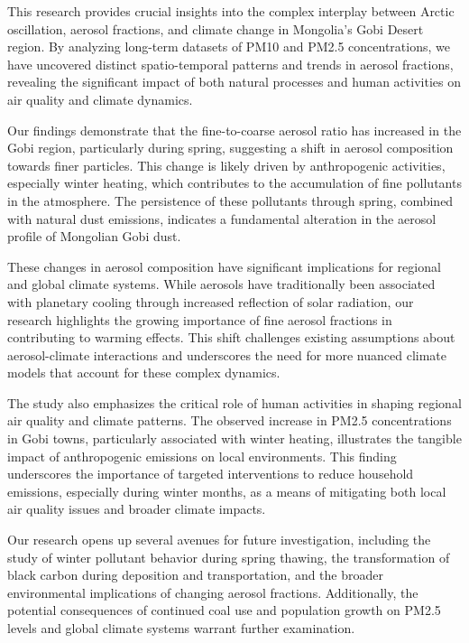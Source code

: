 \documentclass[
  11pt,
]{article}
\begin{document}
This research provides crucial insights into the complex interplay
between Arctic oscillation, aerosol fractions, and climate change in
Mongolia's Gobi Desert region. By analyzing long-term datasets of PM10
and PM2.5 concentrations, we have uncovered distinct spatio-temporal
patterns and trends in aerosol fractions, revealing the significant
impact of both natural processes and human activities on air quality and
climate dynamics.

Our findings demonstrate that the fine-to-coarse aerosol ratio has
increased in the Gobi region, particularly during spring, suggesting a
shift in aerosol composition towards finer particles. This change is
likely driven by anthropogenic activities, especially winter heating,
which contributes to the accumulation of fine pollutants in the
atmosphere. The persistence of these pollutants through spring, combined
with natural dust emissions, indicates a fundamental alteration in the
aerosol profile of Mongolian Gobi dust.

These changes in aerosol composition have significant implications for
regional and global climate systems. While aerosols have traditionally
been associated with planetary cooling through increased reflection of
solar radiation, our research highlights the growing importance of fine
aerosol fractions in contributing to warming effects. This shift
challenges existing assumptions about aerosol-climate interactions and
underscores the need for more nuanced climate models that account for
these complex dynamics.

The study also emphasizes the critical role of human activities in
shaping regional air quality and climate patterns. The observed increase
in PM2.5 concentrations in Gobi towns, particularly associated with
winter heating, illustrates the tangible impact of anthropogenic
emissions on local environments. This finding underscores the importance
of targeted interventions to reduce household emissions, especially
during winter months, as a means of mitigating both local air quality
issues and broader climate impacts.

Our research opens up several avenues for future investigation,
including the study of winter pollutant behavior during spring thawing,
the transformation of black carbon during deposition and transportation,
and the broader environmental implications of changing aerosol
fractions. Additionally, the potential consequences of continued coal
use and population growth on PM2.5 levels and global climate systems
warrant further examination.
\end{document}
